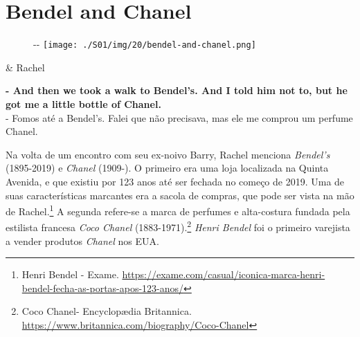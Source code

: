 \hypertarget{bendel-and-chanel}{%
\section{Bendel and Chanel}\label{bendel-and-chanel}}

\begin{figure}[!ht]
  \begin{adjustwidth}{-\oddsidemargin-1in}{-\rightmargin}
    \centering
    \texttt{[image: ./S01/img/20/bendel-and-chanel.png]}
  \end{adjustwidth}
\end{figure}

\begin{tcolorbox}[enhanced,center upper,
    drop fuzzy shadow southeast, boxrule=0.3pt,
    lower separated=false, breakable,
    colframe=black!30!dialogoBorder,colback=white]
\begin{minipage}[c]{0.16\linewidth}
   & \centering \scriptsize{Rachel}
\end{minipage}
\hfill
\begin{minipage}[c]{0.8\linewidth}
  \textbf{- And then we took a walk to Bendel's. And I told him not to, but he got me a little bottle of Chanel.}\\
  - Fomos até a Bendel's. Falei que não precisava, mas ele me comprou um perfume Chanel.
\end{minipage}
\end{tcolorbox}

Na volta de um encontro com seu ex-noivo Barry, Rachel menciona
\emph{Bendel's} (1895-2019) e \emph{Chanel} (1909-). O primeiro era uma
loja localizada na Quinta Avenida, e que existiu por 123 anos até ser
fechada no começo de 2019. Uma de suas características marcantes era a
sacola de compras, que pode ser vista na mão de Rachel.\footnote{\sloppy Henri Bendel - Exame. \url{https://exame.com/casual/iconica-marca-henri-bendel-fecha-as-portas-apos-123-anos/}}
A segunda refere-se a marca de perfumes e alta-costura fundada pela
estilista francesa \emph{Coco Chanel} (1883-1971).\footnote{\sloppy Coco Chanel- Encyclopædia Britannica. \url{https://www.britannica.com/biography/Coco-Chanel}}
\emph{Henri Bendel} foi o primeiro varejista a vender produtos
\emph{Chanel} nos EUA.

